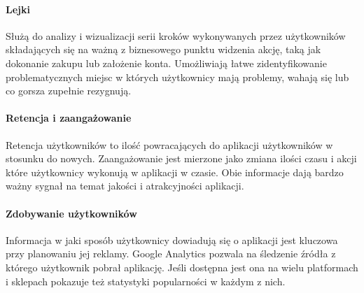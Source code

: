 \paragraph{Lejki}
Służą do analizy i wizualizacji serii kroków wykonywanych przez użytkowników składających się na ważną z biznesowego punktu widzenia akcję, taką jak dokonanie zakupu lub założenie konta. Umożliwiają łatwe zidentyfikowanie problematycznych miejsc w których użytkownicy mają problemy, wahają się lub co gorsza  zupełnie rezygnują.

\paragraph{Retencja i zaangażowanie} 
Retencja użytkowników to ilość powracających do aplikacji użytkowników w stosunku do nowych. Zaangażowanie jest mierzone jako zmiana ilości czasu i akcji które użytkownicy wykonują w aplikacji w czasie. Obie informacje dają bardzo ważny sygnał na temat jakości i atrakcyjności aplikacji.

\paragraph{Zdobywanie użytkowników}
Informacja w jaki sposób użytkownicy dowiadują się o aplikacji jest kluczowa przy planowaniu jej reklamy. Google Analytics pozwala na śledzenie źródła z którego użytkownik pobrał aplikację. Jeśli dostępna jest ona na wielu platformach i sklepach pokazuje też statystyki popularności w każdym z nich.
